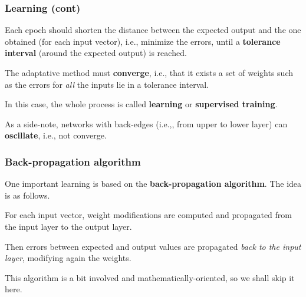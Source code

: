\documentclass[compress,dvipdfmx]{beamer}
\begin{document}
%
\begin{frame}
\frametitle{Learning (cont)}

Each epoch should shorten the distance between the expected output and
the one obtained (for each input vector), i.e., minimize the errors,
until a \textbf{tolerance interval} (around the expected output) is
reached.

\bigskip

The adaptative method must \textbf{converge}, i.e., that it exists a
set of weights such as the errors for \emph{all} the inputs lie in a
tolerance interval.

\bigskip

In this case, the whole process is called \textbf{learning} or
\textbf{supervised training}.

\bigskip

As a side-note, networks with back-edges (i.e.,, from upper to lower
layer) can \textbf{oscillate}, i.e., not converge.

\end{frame}

%
\begin{frame}
\frametitle{Back-propagation algorithm}

One important learning is based on the \textbf{back-propagation
algorithm}. The idea is as follows.

\bigskip

For each input vector, weight modifications are computed and
propagated from the input layer to the output layer.

\bigskip

Then errors between expected and output values are propagated
\emph{back to the input layer}, modifying again the weights.

\bigskip

This algorithm is a bit involved and mathematically-oriented, so we
shall skip it here.

\end{frame}
\end{document}
